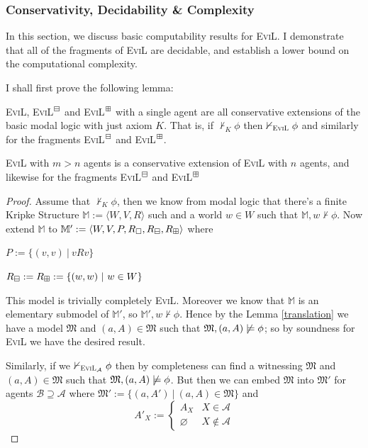 \subsubsection{Conservativity, Decidability \& Complexity}

In this section, we discuss basic computability results for \textsc{EviL}. I demonstrate that all of the fragments of \textsc{EviL} are decidable, and establish a lower bound on the computational complexity.

I shall first prove the following lemma:

\begin{lemma}
\textsc{EviL}, \textsc{EviL}$^\boxminus$ and \textsc{EviL}$^\boxplus$ with a single agent are all conservative extensions of the basic modal logic with just axiom $K$.  That is, if $\nvdash_K \phi$ then $\nvdash_{\textup{\textsc{EviL}}} \phi$ and similarly for the fragments \textsc{EviL}$^\boxminus$ and \textsc{EviL}$^\boxplus$.

\textsc{EviL} with $m > n$ agents is a conservative extension of \textsc{EviL} with $n$ agents, and likewise for the fragments \textsc{EviL}$^\boxminus$ and \textsc{EviL}$^\boxplus$ 
\end{lemma}
\begin{proof}
Assume that $\nvdash_K \phi$, then we know from modal logic that there's a finite Kripke Structure $\mathbb{M} := \langle W, V, R\rangle$ such and a world $w \in W$ such that $\mathbb{M},w \nvdash \phi$.  Now extend $\mathbb{M}$ to $\mathbb{M}' := \langle W, V, P, R_\Box, R_\boxminus, R_\boxplus \rangle$ where
\begin{bul}
	\item $P := \{(v,v)\ |\ v R v\}$
	\item $R_\boxminus := R_\boxplus := \{(w,w)\ |\ w \in W\}$
\end{bul}
This model is trivially completely \textsc{EviL}. Moreover we know that $\mathbb{M}$ is an elementary submodel of $\mathbb{M}'$, so $\mathbb{M}', w\nvdash \phi$.  Hence by the Lemma \ref{translation} we have a model $\mathfrak{M}$ and $(a,A) \in \mathfrak{M}$ such that $\mathfrak{M},(a,A) \not\models \phi$; so by soundness for \textsc{EviL} we have the desired result.

Similarly, if we $\nvdash_{\textup{\textsc{EviL}}_\mathcal{A}} \phi$ then by completeness can find a witnessing $\mathfrak{M}$ and $(a,A) \in \mathfrak{M}$ such that $\mathfrak{M},(a,A) \not\models \phi$.  But then we can embed $\mathfrak{M}$ into $\mathfrak{M}'$ for agents $\mathcal{B} \supseteq \mathcal{A}$ where $\mathfrak{M}' := \{(a,A') \ |\ (a,A) \in \mathfrak{M}\}$ and
$$ A'_X := \begin{cases} A_X & X \in\mathcal{A} \\ \varnothing & X \nin \mathcal{A}\end{cases} $$
\end{proof}

